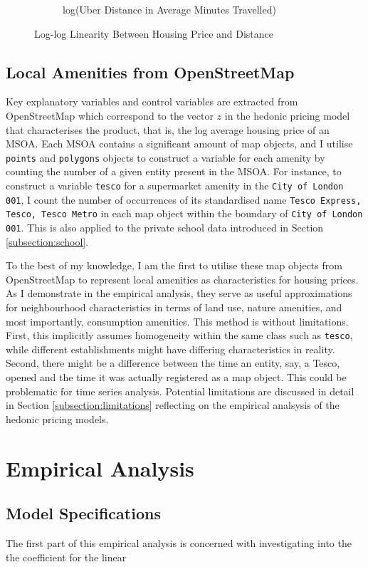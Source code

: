 \documentclass{article}
\begin{document}
\begin{figure}[H]
\begin{subfigure}{.5\textwidth}
      \caption{log(Uber Distance in Average Minutes Travelled)}
      \label{fig:3(b)}
  \end{subfigure}
  \caption{Log-log Linearity Between Housing Price and Distance}
  \label{fig:log_log}
\end{figure}

\subsection{Local Amenities from OpenStreetMap}
Key explanatory variables and control variables are extracted from OpenStreetMap which correspond to the vector $z$ in the hedonic pricing model that characterises the product, that is, the log average housing price of an MSOA. Each MSOA contains a significant amount of map objects, and I utilise \texttt{points} and \texttt{polygons} objects to construct a variable for each amenity by counting the number of a given entity present in the MSOA. For instance, to construct a variable \texttt{tesco} for a supermarket amenity in the \texttt{City of London 001}, I count the number of occurrences of its standardised name \texttt{Tesco Express, Tesco, Tesco Metro} in each map object within the boundary of \texttt{City of London 001}. This is also applied to the private school data introduced in Section \ref{subsection:school}.

To the best of my knowledge, I am the first to utilise these map objects from OpenStreetMap to represent local amenities as characteristics for housing prices. As I demonstrate in the empirical analysis, they serve as useful approximations for neighbourhood characteristics in terms of land use, nature amenities, and most importantly, consumption amenities. This method is without limitations. First, this implicitly assumes homogeneity within the same class such as \texttt{tesco}, while different establishments might have differing characteristics in reality. Second, there might be a difference between the time an entity, say, a Tesco, opened and the time it was actually registered as a map object. This could be problematic for time series analysis. Potential limitations are discussed in detail in Section \ref{subsection:limitations} reflecting on the empirical analsysis of the hedonic pricing models. 

\section{Empirical Analysis} \label{section:model}
\subsection{Model Specifications} \label{subsection:specifications}
The first part of this empirical analysis is concerned with investigating into the the coefficient for the linear 
\end{document}
